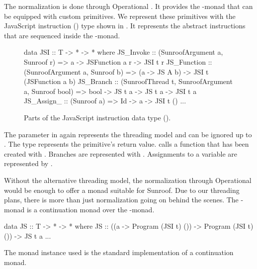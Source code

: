 The normalization is done through Operational 
\cite{Apfelmus:10:Operational,Hackage:10:Operational}.
It provides the -monad that
can be equipped with custom primitives.
We represent these primitives with the JavaScript instruction
(\JSI)
type shown in . It represents the 
abstract instructions that are sequenced inside 
the -monad.
\begin{figure}[t]
\begin{Code}
data JSI :: T -> * -> * where
  JS_Invoke   :: (SunroofArgument a, Sunroof r) 
              => a -> JSFunction a r -> JSI t r
  JS_Function :: (SunroofArgument a, Sunroof b) 
              => (a -> JS A b) -> JSI t (JSFunction a b)
  JS_Branch   :: (SunroofThread t, SunroofArgument a, Sunroof bool) 
              => bool -> JS t a -> JS t a  -> JSI t a
  JS_Assign_  :: (Sunroof a) => Id -> a -> JSI t ()
  ...
\end{Code}
\caption{Parts of the JavaScript instruction data type (\JSI).}
\label{fig:jsi-definition}
\end{figure}
The parameter  in  again represents 
the threading model and can be ignored up to . 
The type  represents the primitive's return value. 
 calls a function that has been created with .
Branches are represented with . Assignments to a variable
are represented by .

Without the alternative threading model, 
the normalization through Operational
would be enough to offer a monad suitable for Sunroof.
Due to our threading plans, there is more than just 
normalization going on behind the scenes. 
The \JS-monad is a continuation monad over the 
-monad.
\begin{Code}
data JS :: T -> * -> * where
  JS :: ((a -> Program (JSI t) ()) -> Program (JSI t) ()) -> JS t a
  ...
\end{Code}
The monad instance used is the standard implementation of 
a continuation monad.

